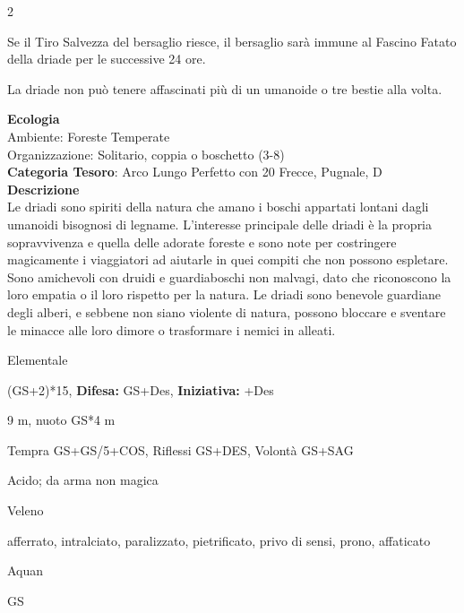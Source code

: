 \begin{multicols}{2}
{Se il Tiro Salvezza del bersaglio riesce, il bersaglio sarà immune al Fascino Fatato della driade per le successive 24 ore.

La driade non può tenere affascinati più di un umanoide o tre bestie alla volta.

\textbf{Ecologia}\\
Ambiente: Foreste Temperate\\
Organizzazione: Solitario, coppia o boschetto (3-8)\\
\textbf{Categoria Tesoro}: Arco Lungo Perfetto con 20 Frecce, Pugnale, D\\
\textbf{Descrizione}\\
Le driadi sono spiriti della natura che amano i boschi appartati lontani dagli umanoidi bisognosi di legname. L'interesse principale delle driadi è la propria sopravvivenza e quella delle adorate foreste e sono note per costringere magicamente i viaggiatori ad aiutarle in quei compiti che non possono espletare.
Sono amichevoli con druidi e guardiaboschi non malvagi, dato che riconoscono la loro empatia o il loro rispetto per la natura.
Le driadi sono benevole guardiane degli alberi, e sebbene non siano violente di natura, possono bloccare e sventare le minacce alle loro dimore o trasformare i nemici in alleati.


\begin{description}[noitemsep, topsep=0pt, parsep=0pt, partopsep=0pt, itemsep=1pt, leftmargin=2.35cm,  labelwidth=2.2cm, itemindent=0cm, listparindent=0pt] %
\setlength{\baselineskip}{10pt}
\item[\textbf{Taglia/Tipo}] Elementale
\item[\textbf{Caratt.}] 
\item[\textbf{Punti Ferita}] (GS+2)*15, \textbf{Difesa:} GS+Des, \textbf{Iniziativa:} +Des
\item[\textbf{Movimento}] 9 m, nuoto GS*4 m
\item[\textbf{Tiri Salvez.}] Tempra GS+GS/5+COS, Riflessi GS+DES, Volontà GS+SAG
\item[\textbf{Res. Danni}] Acido; da arma non magica
\item[\textbf{Imm. Danni}] Veleno
\item[\textbf{Immunità}] afferrato, intralciato, paralizzato, pietrificato, privo di sensi, prono, affaticato
\item[\textbf{Sensi}] 
\item[\textbf{Linguaggi}] Aquan
\item[\textbf{Sfida}] GS \\
\end{description}



}
\end{multicols}
